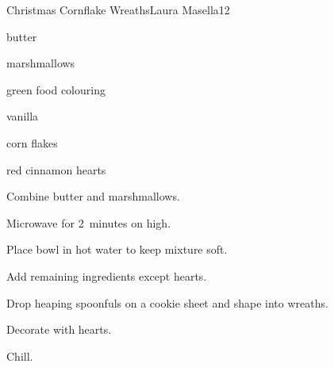 \begin{recipe}{Christmas Cornflake Wreaths}{Laura Masella}{12}

\begin{ingredients}
\item \C{\half} butter
\item {} marshmallows
\item {} green food colouring
\item {} vanilla
\item {} corn flakes 
\item red cinnamon hearts
\end{ingredients}

\begin{directions}
\item Combine butter and marshmallows.
\item Microwave for 2~minutes on high.
\item Place bowl in hot water to keep mixture soft.
\item Add remaining ingredients except hearts.
\item Drop heaping spoonfuls on a cookie sheet and shape into wreaths.
\item Decorate with hearts.
\item Chill.
\end{directions}

\end{recipe}
